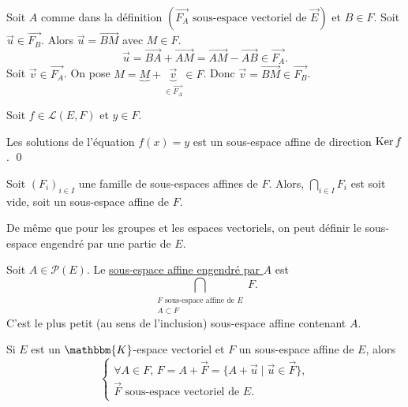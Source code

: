 \begin{prv}
	Soit $A$ comme dans la définition $\left( \vec{F_A} \text{ sous-espace vectoriel de } \vec{E} \right)$ et $B \in F$. Soit $\vec{u} \in \vec{F_B}$. Alors $\vec{u} = \vec{BM}$ avec $M \in F$. \[
		\vec{u} = \vec{BA} + \vec{AM} = \vec{AM} - \vec{AB} \in \vec{F_A}.
	\] Soit $\vec{v} \in \vec{F_A}$. On pose $M = \underbrace{M} + \underbrace{\vec{v}}_{\in \vec{F_A}} \in F$. Donc $\vec{v} = \vec{BM} \in \vec{F_B}$.
\end{prv}

\begin{crlr}
	Soit $f \in \mathcal{L}(E, F)$ et $y \in F$.

	Les solutions de l'équation $f(x) = y$ est un sous-espace affine de direction $\operatorname{Ker} f$.
	\qed
\end{crlr}

\begin{prop}
	Soit $(F_i)_{i\in I}$ une famille de sous-espaces affines de $F$. Alors, $\bigcap_{i \in  I} F_i$ est soit vide, soit un sous-espace affine de $F$.
\end{prop}

De même que pour les groupes et les espaces vectoriels, on peut définir le sous-espace engendré par une partie de $E$.

\begin{prop-defn}
	Soit $A \in \mathcal{P}(E)$. Le \underline{sous-espace affine engendré par $A$} est \[
		\bigcap_{\substack{F \text{ sous-espace affine de } E\\A \subset F}} F
	.\]
	C'est le plus petit (au sens de l'inclusion) sous-espace affine contenant $A$.
\end{prop-defn}

\begin{rmk}
	Si $E$ est un $\mathbbm{K}$-espace vectoriel et $F$ un sous-espace affine de $E$, alors \[
		\begin{cases}
			\forall A \in F,\, F = A + \vec{F} = \{ A + \vec{u}  \mid  \vec{u} \in \vec{F}\},\\
			\vec{F} \text{ sous-espace vectoriel de } E.
		\end{cases}
	\]
\end{rmk}

